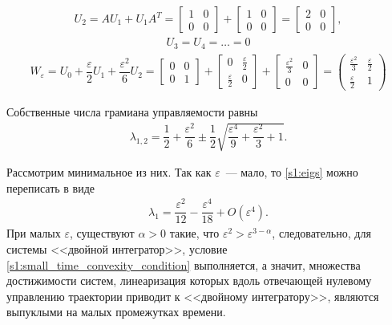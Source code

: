 \documentclass[../main.tex]{subfiles}
\begin{document}
\begin{gather*}
     U_2 = A U_1 + U_1 A^T = \left[ {\begin{array}{*{20}{c}}
             1&0\\
             0&0
     \end{array}}\right] + \left[ {\begin{array}{*{20}{c}}
             1&0\\
             0&0
     \end{array}}\right] = \left[ {\begin{array}{*{20}{c}}
             2&0\\
             0&0
     \end{array}}\right],
\end{gather*}
\begin{gather*}
     U_3 = U_4 = \dots = 0
\end{gather*}
\begin{gather*}
     W_{\varepsilon} = U_0 + \dfrac{\varepsilon}{2} U_1 + \dfrac{\varepsilon^2}{6} U_2 = \left[ {\begin{array}{*{20}{c}}
             0&0\\
             0&1
     \end{array}}\right] + \left[ {\begin{array}{*{20}{c}}
             0&\frac{\varepsilon}{2}\\
             \frac{\varepsilon}{2}&0
     \end{array}}\right] +\left[ {\begin{array}{*{20}{c}}
             \frac{\varepsilon^2}{3}&0\\
             0&0
     \end{array}}\right] =  
     \begin{pmatrix}
         \frac{\varepsilon^2}{3}&\frac{\varepsilon}{2}\\
         \frac{\varepsilon}{2}&1
     \end{pmatrix} 
\end{gather*}
 
Собственные числа грамиана управляемости равны
\begin{gather}\label{s1:eigs}
     \lambda_{1,2} = \dfrac{1}{2}+\dfrac{\varepsilon^2}{6} \pm \dfrac{1}{2}\sqrt{\dfrac{\varepsilon^4}{9} + \dfrac{\varepsilon^2}{3} +1}.
\end{gather}
 
Рассмотрим минимальное из них.
Так как $ \varepsilon $~--- мало, то \eqref{s1:eigs} можно переписать в виде
\begin{gather*}
    \lambda_1 = \dfrac{\varepsilon^2}{12} - \dfrac{\varepsilon^4}{18} + O(\varepsilon^4).
\end{gather*} 
При малых $ \varepsilon $, существуют $\alpha >0 $ такие, что $ \varepsilon^2 >  \varepsilon^{3-\alpha}  $, следовательно,  для системы <<двойной интегратор>>, условие \eqref{s1:small_time_convexity_condition} выполняется, а значит, множества достижимости систем, линеаризация которых вдоль отвечающей нулевому управлению траектории приводит к <<двойному интегратору>>, являются выпуклыми на малых промежутках времени.
\end{document}
